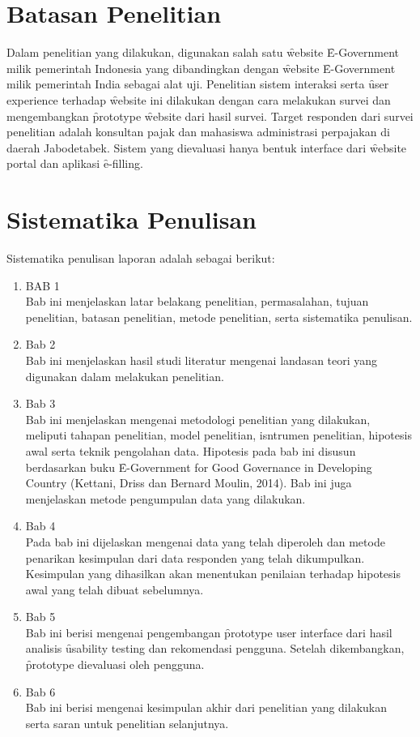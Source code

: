 \section{Batasan Penelitian}
Dalam penelitian yang dilakukan, digunakan salah satu \f{website} \f{E-Government} milik pemerintah Indonesia yang dibandingkan dengan \f{website} \f{E-Government} milik pemerintah India sebagai alat uji. Penelitian sistem interaksi serta \f{user experience} terhadap \f{website} ini dilakukan dengan cara melakukan survei dan mengembangkan \f{prototype} \f{website} dari hasil survei. Target responden dari survei penelitian adalah konsultan pajak dan mahasiswa administrasi perpajakan di daerah Jabodetabek. Sistem yang dievaluasi hanya bentuk interface dari \f{website} portal dan aplikasi \f{e-filling}.
\section{Sistematika Penulisan}
Sistematika penulisan laporan adalah sebagai berikut:
\begin{enumerate}
	\item BAB 1 \babSatu \\
	Bab ini menjelaskan latar belakang penelitian, permasalahan, tujuan penelitian, batasan penelitian, metode penelitian, serta sistematika penulisan. 
	\item Bab 2 \babDua \\
	Bab ini menjelaskan hasil studi literatur mengenai landasan teori yang digunakan dalam melakukan penelitian.
	\item Bab 3 \babTiga \\
	Bab ini menjelaskan mengenai metodologi penelitian yang dilakukan, meliputi tahapan penelitian, model penelitian, isntrumen penelitian, hipotesis awal serta teknik pengolahan data. Hipotesis pada bab ini disusun berdasarkan buku \f{E-Government for Good Governance in Developing Country} (Kettani, Driss dan Bernard Moulin, 2014). Bab ini juga menjelaskan metode pengumpulan data yang dilakukan.
	\item Bab 4 \babEmpat \\
	Pada bab ini dijelaskan mengenai data yang telah diperoleh dan metode penarikan kesimpulan dari data responden yang telah dikumpulkan. Kesimpulan yang dihasilkan akan menentukan penilaian terhadap hipotesis awal yang telah dibuat sebelumnya.
	\item Bab 5 \babLima \\
	Bab ini berisi mengenai pengembangan \f{prototype user interface} dari hasil analisis \f{usability testing} dan rekomendasi pengguna. Setelah dikembangkan, \f{prototype} dievaluasi oleh pengguna.
	\item Bab 6 \babEnam \\
	Bab ini berisi mengenai kesimpulan akhir dari penelitian yang dilakukan serta saran untuk penelitian selanjutnya.
\end{enumerate}
